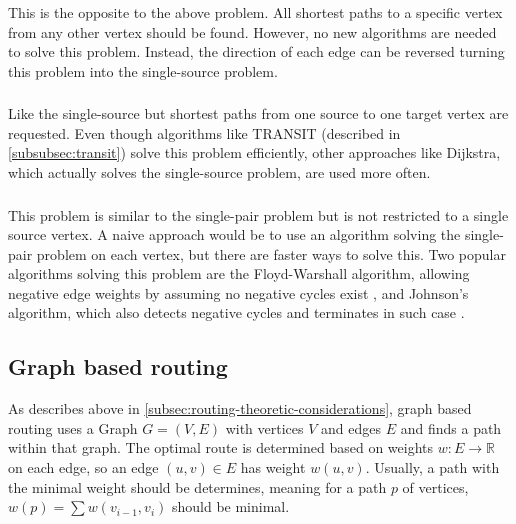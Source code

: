 		\subsubsection{}
		
			This is the opposite to the above problem.
			All shortest paths to a specific vertex from any other vertex should be found.
			However, no new algorithms are needed to solve this problem.
			Instead, the direction of each edge can be reversed turning this problem into the single-source problem.
		
		\subsubsection{}
		
			Like the single-source but shortest paths from one source to one target vertex are requested.
			Even though algorithms like TRANSIT (described in \cref{subsubsec:transit}) solve this problem efficiently, other approaches like Dijkstra, which actually solves the single-source problem, are used more often.
		
		\subsubsection{}
		\label{subsubsec:all-pair-shortest-path}
		
			This problem is similar to the single-pair problem but is not restricted to a single source vertex.
			A naive approach would be to use an algorithm solving the single-pair problem on each vertex, but there are faster ways to solve this.
			Two popular algorithms solving this problem are the Floyd-Warshall algorithm, allowing negative edge weights by assuming no negative cycles exist \cite[693]{cormen-introduction-to-alg}, and Johnson's algorithm, which also detects negative cycles and terminates in such case \cite[700]{cormen-introduction-to-alg}.

	\subsection{Graph based routing}
		
		As describes above in \cref{subsec:routing-theoretic-considerations}, graph based routing uses a Graph $G=(V, E)$ with vertices $V$ and edges $E$ and finds a path within that graph.
		The optimal route is determined based on weights $w : E \rightarrow \mathbb{R}$ on each edge, so an edge $(u, v) \in E$ has weight $w(u, v)$.
		Usually, a path with the minimal weight should be determines, meaning for a path $p$ of vertices, $w(p) = \sum{w(v_{i-1}, v_i)}$ should be minimal\cite[645]{cormen-introduction-to-alg}.
		
